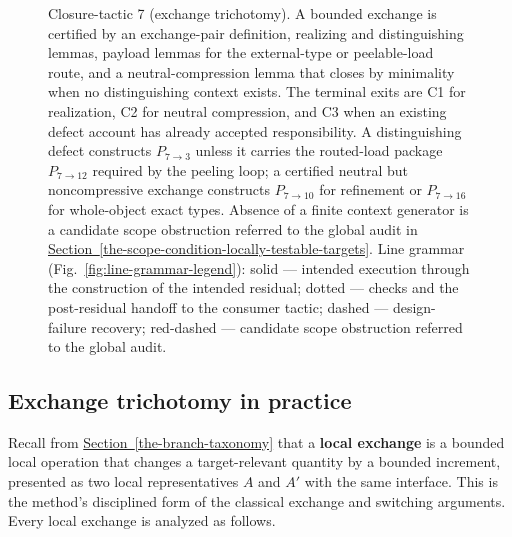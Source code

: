 \documentclass[
  11pt,
]{article}
\theoremstyle{definition}
\newcommand{\secref}[1]{\hyperref[#1]{Section~\ref*{#1}}}
\begin{document}
\begin{figure}[p]
{%
}
\caption[Closure-tactic 7: exchange trichotomy]{Closure-tactic 7 (exchange trichotomy).  A bounded exchange is certified by an exchange-pair definition, realizing and distinguishing lemmas, payload lemmas for the external-type or peelable-load route, and a neutral-compression lemma that closes by minimality when no distinguishing context exists.  The terminal exits are C1 for realization, C2 for neutral compression, and C3 when an existing defect account has already accepted responsibility.  A distinguishing defect constructs \(P_{7\to3}\) unless it carries the routed-load package \(P_{7\to12}\) required by the peeling loop; a certified neutral but noncompressive exchange constructs \(P_{7\to10}\) for refinement or \(P_{7\to16}\) for whole-object exact types.  Absence of a finite context generator is a candidate scope obstruction referred to the global audit in \secref{the-scope-condition-locally-testable-targets}.  Line grammar (Fig.~\ref{fig:line-grammar-legend}): solid --- intended execution through the construction of the intended residual; dotted --- checks and the post-residual handoff to the consumer tactic; dashed --- design-failure recovery; red-dashed --- candidate scope obstruction referred to the global audit.}
\label{fig:ct7-exchange-trichotomy}
\end{figure}
\FloatBarrier

\subsection*{Exchange trichotomy in practice}

Recall from \secref{the-branch-taxonomy} that a \textbf{local exchange} is a bounded local
operation that changes a target-relevant quantity by a bounded
increment, presented as two local representatives \(A\) and \(A'\) with
the same interface. This is the method's disciplined form of the
classical exchange and switching arguments. Every local exchange is
analyzed as follows.
\end{document}
